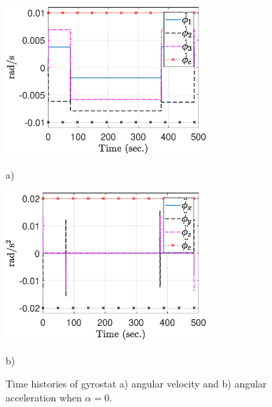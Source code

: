 \documentclass[letterpaper, paper,12pt]{AAS}		%
\begin{document}
\begin{figure}[!htb]
    \centering
    \begin{minipage}{.5\textwidth}
        \centering
  \includegraphics[width=3in]{figures/alpha0/ang_vel.eps}
    \caption{a)}
    \end{minipage}%
    \begin{minipage}{0.5\textwidth}
        \centering
       \includegraphics[width=3in]{figures/alpha0/ang_accel.eps}
       \caption{b)}
    \end{minipage}
    \caption{Time histories of gyrostat a) angular velocity and b) angular acceleration when $\alpha=0$.}
    \label{fig:ang_vel_acc0} 
\end{figure}
\end{document}
